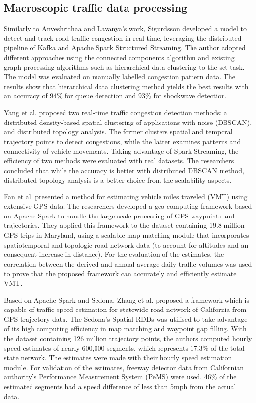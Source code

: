 \documentclass[11pt]{uonthesis}
\begin{document}
\subsection{Macroscopic traffic data processing}
Similarly to Anveshrithaa and Lavanya's work, Sigurdsson\cite{Sigurdsson2018RoadTC} developed a model to detect and track road traffic congestion in real time, leveraging the distributed pipeline of Kafka and Apache Spark Structured Streaming. The author adopted different approaches using the connected components algorithm and existing graph processing algorithms such as hierarchical data clustering to the set task. The model was evaluated on manually labelled congestion pattern data. The results show that hierarchical data clustering method yields the best results with an accuracy of 94\% for queue detection and 93\% for shockwave detection. 

Yang et al.\cite{Yang2019} proposed two real-time traffic congestion detection methods: a distributed density-based spatial clustering of applications with noise (DBSCAN), and distributed topology analysis. The former clusters spatial and temporal trajectory points to detect congestions, while the latter examines patterns and connectivity of vehicle movements. Taking advantage of Spark Streaming, the efficiency of two methods were evaluated with real datasets. The researchers concluded that while the accuracy is better with distributed DBSCAN method, distributed topology analysis is a better choice from the scalability aspects.

Fan et al.\cite{FAN2019298} presented a method for estimating vehicle miles traveled (VMT) using extensive GPS data. The researchers developed a geo-computing framework based on Apache Spark to handle the large-scale processing of GPS waypoints and trajectories. They applied this framework to the dataset containing 19.8 million GPS trips in Maryland, using a scalable map-matching module that incorporates spatiotemporal and topologic road network data (to account for altitudes and an consequent increase in distance). For the evaluation of the estimates, the correlation between the derived and annual average daily traffic volumes was used to prove that the proposed framework can accurately and efficiently estimate VMT.

Based on Apache Spark and Sedona, Zhang et al.\cite{Zhang20231124} proposed a framework which is capable of traffic speed estimation for statewide road network of California from GPS trajectory data. The Sedona's Spatial RDDs was utilised to take advantage of its high computing efficiency in map matching and waypoint gap filling. With the dataset containing 126 million trajectory points, the authors computed hourly speed estimates of nearly 600,000 segments, which represents 17.3\% of the total state network. The estimates were made with their hourly speed estimation module. For validation of the estimates, freeway detector data from Californian authority's Performance Measurement System (PeMS) were used. 46\% of the estimated segments had a speed difference of less than 5mph from the actual data. 
\end{document}
